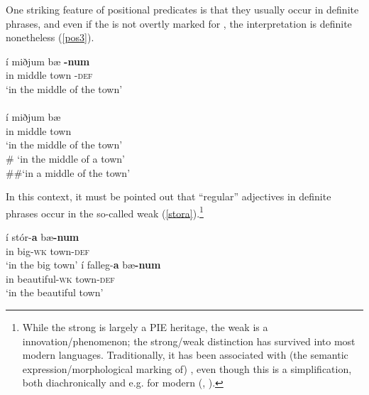 \documentclass[output=paper,colorlinks,citecolor=brown]{langscibook}
\begin{document}
One striking feature of positional predicates is that they usually occur in  definite  phrases, and even if the  is  not overtly marked for , the interpretation is definite nonetheless (\ref{pos3}).


\begin{multicols}{2}{
\begin{exe}
  \ex\label{pos3}
   \begin{xlist}
      \ex \gll í miðjum bæ \textbf{-num} \\
        in middle town \textsc{-def} \\  
        \glt `in the middle of the town' \\ \ \\

     \ex \gll í miðjum bæ \\
       in middle town  \\ 
       \glt `in the middle of the town' \\
       \glt $\#$  `in the middle of a town'  \\ 
       \glt $\#\#$`in a middle of the  town'
  \end{xlist}
\end{exe} }
\end{multicols}

In this context, it must be pointed out that ``regular'' adjectives in definite  phrases occur in the so-called weak  (\ref{stora}).\footnote{While the strong  is largely a PIE heritage, the weak  is a  innovation/phenomenon; the strong/weak distinction has survived into most modern  languages. Traditionally, it has been associated with (the semantic expression/morphological marking of) , even though this is a simplification, both diachronically and e.g. for modern  (\citealt{ratkus2011, Pfaff2017,Pfaff2019, Rehn2019}, ). }  

{\small 
\begin{multicols}{2}{
\begin{exe}
  \ex \label{stora}
     \begin{xlist}
        \ex \gll í stór-\textbf{a} bæ\textbf{-num} \\
          in big-\textsc{wk} town\textsc{-def} \\ 
           \glt `in the big town' 
        \ex \gll í falleg-\textbf{a} bæ\textbf{-num} \\
           in beautiful-\textsc{wk} town\textsc{-def}  \\ 
           \glt `in the beautiful town'  
  \end{xlist}
\end{exe}}
\end{multicols}}
\end{document}

